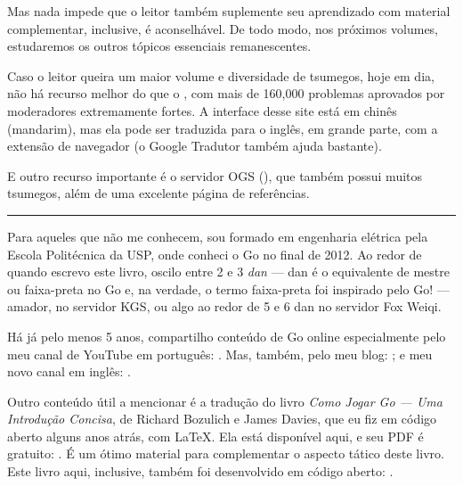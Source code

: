 Mas nada impede que o leitor também suplemente seu aprendizado com material complementar, inclusive, é aconselhável. De todo modo, nos próximos volumes, estudaremos os outros tópicos essenciais remanescentes.

Caso o leitor queira um maior volume e diversidade de tsumegos, hoje em dia, não há recurso melhor do que o , com mais de 160,000 problemas aprovados por moderadores extremamente fortes. A interface desse site está em chinês (mandarim), mas ela pode ser traduzida para o inglês, em grande parte, com a extensão de navegador  (o Google Tradutor também ajuda bastante).

E outro recurso importante é o servidor OGS (), que também possui muitos tsumegos, além de uma excelente página de referências.

\vspace{0.03cm}

\begin{center}
  \rule{3.25cm}{0.15mm}
\end{center}

\vspace{0.1cm}

Para aqueles que não me conhecem, sou formado em engenharia elétrica pela Escola Politécnica da USP, onde conheci o Go no final de 2012. Ao redor de quando escrevo este livro, oscilo entre 2 e 3 \emph{dan} --- dan é o equivalente de mestre ou faixa-preta no Go e, na verdade, o termo faixa-preta foi inspirado pelo Go! --- amador, no servidor KGS, ou algo ao redor de 5 e 6 dan no servidor Fox Weiqi.

Há já pelo menos 5 anos, compartilho conteúdo de Go online especialmente pelo meu canal de YouTube em português: . Mas, também, pelo meu blog: ; e meu novo canal em inglês: .

Outro conteúdo útil a mencionar é a tradução do livro \emph{Como Jogar Go --- Uma Introdução Concisa}, de Richard Bozulich e James Davies, que eu fiz em código aberto alguns anos atrás, com \LaTeX. Ela está disponível aqui, e seu PDF é gratuito: . É um ótimo material para complementar o aspecto tático deste livro. Este livro aqui, inclusive, também foi desenvolvido em código aberto: .

